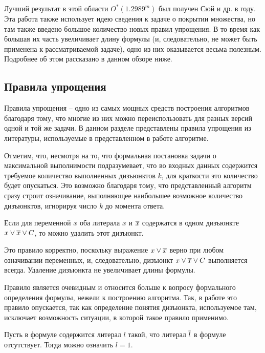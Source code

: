 Лучший результат в этой области $O^*(1.2989^m)$ был получен Сюй и др. \cite{xu19} в \citeyear{xu19} году. Эта работа также использует идею сведения к задаче о покрытии множества, но там также введено большое количество новых правил упрощения. В то время как большая их часть увеличивает длину формулы (и, следовательно, не может быть применена к рассматриваемой задаче), одно из них оказывается весьма полезным. Подробнее об этом рассказано в данном обзоре ниже.

\subsection{Правила упрощения}
\label{subsec:literature-review:rrules}

\firstpar{}Правила упрощения -- одно из самых мощных средств построения алгоритмов благодаря тому, что многие из них можно переиспользовать для разных версий одной и той же задачи. В данном разделе представлены правила упрощения из литературы, используемые в представленном в работе алгоритме.

Отметим, что, несмотря на то, что формальная постановка задачи о максимальной выполнимости подразумевает, что во входных данных содержится требуемое количество выполненных дизъюнктов $k$, для краткости это количество будет опускаться. Это возможно благодаря тому, что представленный алгоритм сразу строит означивание, выполняющее наибольшее возможное количество дизъюнктов, игнорируя число $k$ до момента ответа.

\begin{rrule}
 Если для переменной $x$ оба литерала $x$ и $\overline{x}$ содержатся в одном дизъюнкте $x \vee \overline{x} \vee C$, то можно удалить этот дизъюнкт.
 \label{rrule:common:complementary}
\end{rrule}

Это правило корректно, поскольку выражение $x \vee \overline{x}$ верно при любом означивании переменных, и, следовательно, дизъюнкт $x \vee \overline{x} \vee C$ выполняется всегда. Удаление дизъюнкта не увеличивает длины формулы.

Правило является очевидным и относится больше к вопросу формального определения формулы, нежели к построению алгоритма. Так, в работе \cite{bansal99} это правило опускается, так как определение понятия дизъюнкта, используемое там, исключает возможность ситуации, в которой такое правило применимо.

\begin{rrule}
 Пусть в формуле содержится литерал $l$ такой, что литерал $\overline{l}$ в формуле отсутствует. Тогда можно означить $l = 1$.
 \label{rrule:common:i0}
\end{rrule}

